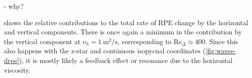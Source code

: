 - why?

 shows the relative contributions to the total rate of RPE change by the horizontal and vertical components. There is once again a minimum in the contribution by the vertical component at $\nu_h = \SI{1}{\square\metre\per\second}$, corresponding to $\mathrm{Re}_\Delta \approx 400$. Since this also happens with the z-star and continuous isopycnal coordinates (\cref{fig:waves-drpe}), it is mostly likely a feedback effect or resonance due to the horizontal viscosity.
